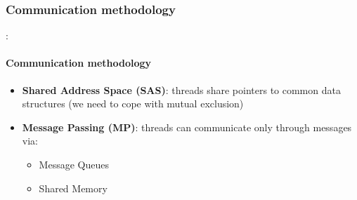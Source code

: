 \documentclass[12pt]{beamer}
\begin{document}
	\subsubsection{Communication methodology}
	\begin{frame}{\secname : \subsecname}
		\framesubtitle{Communication methodology}
		\begin{itemize}
			\item \textbf{Shared Address Space (SAS)}: threads share pointers to common data structures (we need
			to cope with mutual exclusion)
			\item \textbf{Message Passing (MP)}: threads can communicate only through messages via:
			\begin{itemize}
				\item Message Queues
				\item Shared Memory
			\end{itemize}
		\end{itemize}
	\end{frame}
\end{document}
